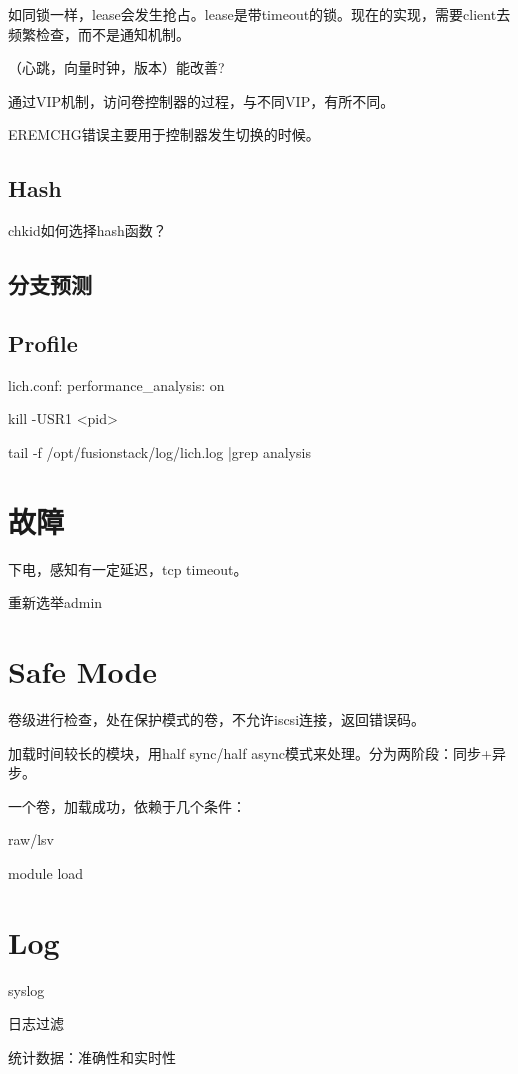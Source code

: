 如同锁一样，lease会发生抢占。lease是带timeout的锁。现在的实现，需要client去频繁检查，而不是通知机制。

（心跳，向量时钟，版本）能改善?

通过VIP机制，访问卷控制器的过程，与不同VIP，有所不同。

EREMCHG错误主要用于控制器发生切换的时候。

\subsection{Hash}

chkid如何选择hash函数？

\subsection{分支预测}

\subsection{Profile}

lich.conf: performance\_analysis: on

kill -USR1 <pid>

tail -f /opt/fusionstack/log/lich.log |grep analysis

\section{故障}

下电，感知有一定延迟，tcp timeout。

重新选举admin

\section{Safe Mode}

卷级进行检查，处在保护模式的卷，不允许iscsi连接，返回错误码。

加载时间较长的模块，用half sync/half async模式来处理。分为两阶段：同步+异步。

一个卷，加载成功，依赖于几个条件：
\begin{compactitem}
    \item raw/lsv
    \item module load
\end{compactitem}

\section{Log}

syslog

日志过滤

统计数据：准确性和实时性
